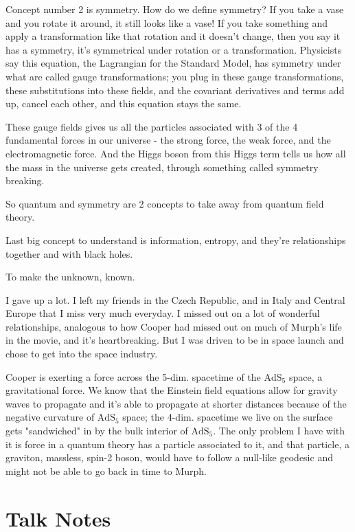 \documentclass[10pt]{amsart}
\begin{document}
Concept number 2 is symmetry. How do we define symmetry? If you take a vase and you rotate it around, it still looks like a vase! If you take something and apply a transformation like that rotation and it doesn't change, then you say it has a symmetry, it's symmetrical under rotation or a transformation. Physicists say this equation, the Lagrangian for the Standard Model, has symmetry under what are called gauge transformations; you plug in these gauge transformations, these substitutions into these fields, and the covariant derivatives and terms add up, cancel each other, and this equation stays the same.

These gauge fields gives us all the particles associated with 3 of the 4 fundamental forces in our universe - the strong force, the weak force, and the electromagnetic force. And the Higgs boson from this Higgs term tells us how all the mass in the universe gets created, through something called symmetry breaking.

So quantum and symmetry are 2 concepts to take away from quantum field theory.

Last big concept to understand is information, entropy, and they're relationships together and with black holes.



To make the unknown, known.

I gave up a lot. I left my friends in the Czech Republic, and in Italy and Central Europe that I miss very much everyday. I missed out on a lot of wonderful relationships, analogous to how Cooper had missed out on much of Murph's life in the movie, and it's heartbreaking. But I was driven to be in space launch and chose to get into the space industry.

Cooper is exerting a force across the 5-dim. spacetime of the $\text{AdS}_5$ space, a gravitational force. We know that the Einstein field equations allow for gravity waves to propagate and it's able to propagate at shorter distances because of the negative curvature of $\text{AdS}_5$ space; the 4-dim. spacetime we live on the surface gets "sandwiched" in by the bulk interior of $\text{AdS}_5$. The only problem I have with it is force in a quantum theory has a particle associated to it, and that particle, a graviton, massless, spin-2 boson, would have to follow a null-like geodesic and might not be able to go back in time to Murph.


\section{Talk Notes}
\end{document}
